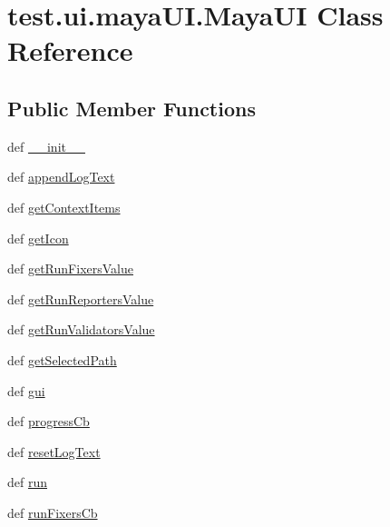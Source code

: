 \hypertarget{classtest_1_1ui_1_1mayaUI_1_1MayaUI}{\section{test.\-ui.\-maya\-U\-I.\-Maya\-U\-I \-Class \-Reference}
\label{d6/d67/classtest_1_1ui_1_1mayaUI_1_1MayaUI}
}
\subsection*{\-Public \-Member \-Functions}
\begin{DoxyCompactItemize}
\item 
def \hyperlink{classtest_1_1ui_1_1mayaUI_1_1MayaUI_a7f76d3b5b498ab459aa9cbad9bf484b7}{\-\_\-\-\_\-init\-\_\-\-\_\-}
\item 
def \hyperlink{classtest_1_1ui_1_1mayaUI_1_1MayaUI_aad49c0b8c21f738c7776e97db8a9eae8}{append\-Log\-Text}
\item 
def \hyperlink{classtest_1_1ui_1_1mayaUI_1_1MayaUI_a084387f910b2e7c02400a2b2c71d163e}{get\-Context\-Items}
\item 
def \hyperlink{classtest_1_1ui_1_1mayaUI_1_1MayaUI_a9cc8df9453a39f74e759e6034e3e6bce}{get\-Icon}
\item 
def \hyperlink{classtest_1_1ui_1_1mayaUI_1_1MayaUI_a5ee23d89e60e680c126f9838a5e4ecdc}{get\-Run\-Fixers\-Value}
\item 
def \hyperlink{classtest_1_1ui_1_1mayaUI_1_1MayaUI_ab29f45ac91be2bb4ff56eeeaa56a7cd5}{get\-Run\-Reporters\-Value}
\item 
def \hyperlink{classtest_1_1ui_1_1mayaUI_1_1MayaUI_a8d09baf8f5bac07bdd069178c02ae8db}{get\-Run\-Validators\-Value}
\item 
def \hyperlink{classtest_1_1ui_1_1mayaUI_1_1MayaUI_aaca33035645152d9deee4f9feb763b19}{get\-Selected\-Path}
\item 
def \hyperlink{classtest_1_1ui_1_1mayaUI_1_1MayaUI_a0e88690c0103a7567757d670bcc06b91}{gui}
\item 
def \hyperlink{classtest_1_1ui_1_1mayaUI_1_1MayaUI_a7e85867267c9e9a966aab0013d644e7e}{progress\-Cb}
\item 
def \hyperlink{classtest_1_1ui_1_1mayaUI_1_1MayaUI_a08d0e256d05c05f4255e0e9531cbbefa}{reset\-Log\-Text}
\item 
def \hyperlink{classtest_1_1ui_1_1mayaUI_1_1MayaUI_af4bff1a9c4be6be0749bd7777ec068ee}{run}
\item 
def \hyperlink{classtest_1_1ui_1_1mayaUI_1_1MayaUI_aa2175afcf6fefb6a514aeb1e6c5ff6b4}{run\-Fixers\-Cb}

\end{DoxyCompactItemize}
